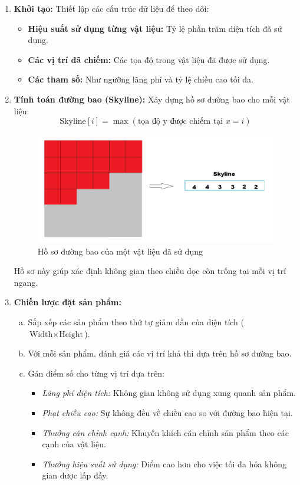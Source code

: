 \begin{enumerate}[1) ]
    \item \textbf{Khởi tạo:} Thiết lập các cấu trúc dữ liệu để theo dõi:
    \begin{itemize}
        \item \textbf{Hiệu suất sử dụng từng vật liệu:} Tỷ lệ phần trăm diện tích đã sử dụng.
        \item \textbf{Các vị trí đã chiếm:} Các tọa độ trong vật liệu đã được sử dụng.
        \item \textbf{Các tham số:} Như ngưỡng lãng phí và tỷ lệ chiều cao tối đa.
    \end{itemize}
    \item \textbf{Tính toán đường bao (Skyline):} Xây dựng hồ sơ đường bao cho mỗi vật liệu:
    \[
    \text{Skyline}[i] = \max(\text{tọa độ y được chiếm tại } x = i)
    \]
    \begin{figure}[!htp]
        \centering
        \includegraphics[width=0.4\linewidth]{Images/skyline.png}
        \caption{Hồ sơ đường bao của một vật liệu đã sử dụng}
        \label{fig:enter-label}
    \end{figure}
    Hồ sơ này giúp xác định không gian theo chiều dọc còn trống tại mỗi vị trí ngang.
    \item \textbf{Chiến lược đặt sản phẩm:} 
    \begin{enumerate}[a)]
        \item Sắp xếp các sản phẩm theo thứ tự giảm dần của diện tích (\( \text{Width} \times \text{Height} \)).
        \item Với mỗi sản phẩm, đánh giá các vị trí khả thi dựa trên hồ sơ đường bao.
        \item Gán điểm số cho từng vị trí dựa trên:
        \begin{itemize}
            \item \textit{Lãng phí diện tích:} Không gian không sử dụng xung quanh sản phẩm.
            \item \textit{Phạt chiều cao:} Sự không đều về chiều cao so với đường bao hiện tại.
            \item \textit{Thưởng căn chỉnh cạnh:} Khuyến khích căn chỉnh sản phẩm theo các cạnh của vật liệu.
            \item \textit{Thưởng hiệu suất sử dụng:} Điểm cao hơn cho việc tối đa hóa không gian được lấp đầy.

\end{itemize}
\end{enumerate}
\end{enumerate}

